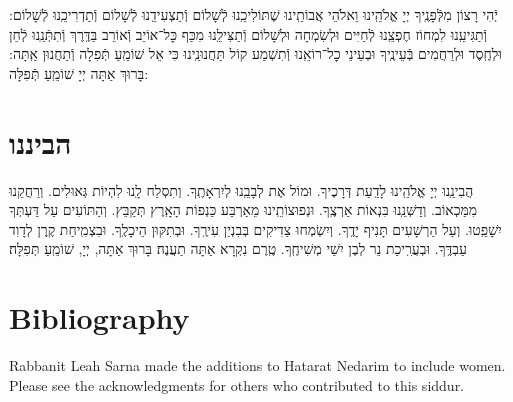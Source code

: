 \documentclass[twoside, openany, parskip=half, 11pt]{book}
\begin{document}
יְֿהִי רָצוֹן מִלְּֿפָנֶֽיךָ יְיָ אֱלֹהֵֽינוּ וֵאלֹהֵי אֲבוֹתֵֽינוּ שֶׁתּוֹלִיכֵֽנוּ לְֿשָׁלוֹם וְֿתַצְעִידֵֽנוּ לְֿשָׁלוֹם וְֿתַדְרִיכֵֽנוּ לְֿשָׁלוֹם: וְֿתַגִּיעֵֽנוּ לִמְחוֹז חֶפְצֵֽנוּ לְֿחַיִּים וּלְשִׂמְחָה וּלְשָׁלוֹם וְֿתַצִּילֵֽנוּ מִכַּף כׇּל־אוֹיֵב וְֿאוֹרֵב בַּדֶּֽרֶךְ וְֿתִתְּֿנֵֽנוּ לְֿחֵן וּלְחֶֽסֶד וּלְרַחֲמִים בְּֿעֵינֶֽיךָ וּבְעֵינֵי כׇל־רוֹאֵֽנוּ וְֿתִשְׁמַע קוֹל תַּחֲנוּנֵֽינוּ כִּי אֵל שׁוֹמֵֽעַ תְּֿפִלָה וְֿתַחֲנוּן אַֽתָּה: בָּרוּךְ אַתָּה יְיָ שׁוֹמֵֽעַ תְּֿפִלָּה:\\

\chapter{הביננו}


הֲבִינֵֽנוּ יְיָ אֱלֹהֵֽינוּ לָדַֽעַת דְּרָכֶיךָ. וּמוֹל אֶת לְבָבֵֽנוּ לְיִרְאָתֶֽךָ. וְתִסְלַח לָֽנוּ לִהְיוֹת גְּאוּלִים. וְרַחֲקֵנוּ מִמַּכְאוֹב. וְדַשְּׁנֵֽנוּ בִּנְאוֹת אַרְצֶֽךָ. וּנְפוּצוֹתֵֽינוּ מֵאַרְבַּע כַּנְפוֹת הָאָֽרֶץ תְּקַבֵּץ. וְהַתּוֹעִים עַל דַּעְתְּךָ יִשָׁפֵֽטוּ. וְעַל הַרְשָׁעִים תָּנִיף יָדֶֽךָ. וְיִשְׂמְחוּ צַדִיקִים בְּבִנְיַן עִירֶֽךָ. וּבְתִקּוּן הֵיכָלֶֽךָ. וּבִצְמִֽיחַת קֶֽרֶן לְדָוִד עַבְדֶּֽךָ. וּבְעֲרִֽיכַת נֵר לְבֶן יִשַׁי מְשִׁיחֶֽךָ. טֶֽרֶם נִקְרָא אַתָּה תַעֲנֶה׃ בָּרוּךְ אַתָּה, יְיָ, שׁוֹמֵֽעַ תְּפִלָּה׃ 

\chapter{Bibliography}
	\begin{english}
		\nocite{artcant}
		\nocite{artscroll}
		\nocite{avodasyisroel}
		\nocite{birnbaum}
		\nocite{korenyt}
		\nocite{mapm}
		\nocite{olastamid}
		\nocite{levshalem}
		\nocite{sacks_koren_2016}
		\nocite{simshalom}
		\nocite{simshalomweekday}
		\nocite{tefillatyesharim}
		\nocite{birkat_haminim}

		\printbibliography
		Rabbanit Leah Sarna made the additions to Hatarat Nedarim to include women.  Please see the acknowledgments for others who contributed to this siddur.
		
	\end{english}
	
\end{document}

